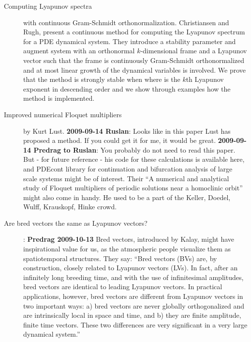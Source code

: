 \begin{description}
\item[Computing {L}yapunov spectra] with continuous
         {Gram-Schmidt} orthonormalization.
Christiansen and Rugh,
present a
  continuous method for computing the Lyapunov
  spectrum for a PDE dynamical system. They introduce a
  stability parameter and augment system with
  an orthonormal $k$-dimensional frame and a Lyapunov vector such
  that the frame is continuously Gram-Schmidt orthonormalized
  and at most linear growth of the dynamical variables is
  involved. We prove that the method is strongly stable when
  where is the $k$th Lyapunov exponent in descending order and we
  show through examples how the method is implemented.

\item[Improved numerical Floquet
multipliers] by
     {Kurt Lust}.  {\bf 2009-09-14 Ruslan}:
Looks like  in this paper {Lust} has proposed a method. If you
could get it for me, it would be great. {\bf 2009-09-14 Predrag
to Ruslan}: You probably do not need to read this paper.
But - for future reference - his
     code for these calculations is
     {available here}, and
     {PDEcont library}  for continuation and bifurcation analysis
      of large scale systems might be of interest.
Their ``A numerical and analytical study of Floquet
        multipliers of periodic solutions near
        a homoclinic orbit''
might also come in handy.
He used to be a part of the Keller, Doedel, Wulff, Krauskopf,
Hinke crowd.


\item[Are bred vectors the same as
    {L}yapunov vectors?]: {\bf Predrag
2009-10-13} Bred vectors, introduced by Kalay, might have
inspirational value for us, as the atmospheric people
visualize them as spatiotemporal structures. They say:
    ``Bred vectors (BVs) are, by construction, closely
related to Lyapunov vectors (LVs). In fact, after an
infinitely long breeding time, and with the use of
infinitesimal amplitudes, bred vectors are identical to
leading Lyapunov vectors. In practical applications,
however, bred vectors are different from Lyapunov
vectors in two important ways: a) bred vectors are
never globally orthogonalized and are intrinsically
local in space and time, and b) they are finite
amplitude, finite time vectors. These two differences
are very significant in a very large dynamical system.''


\end{description}
